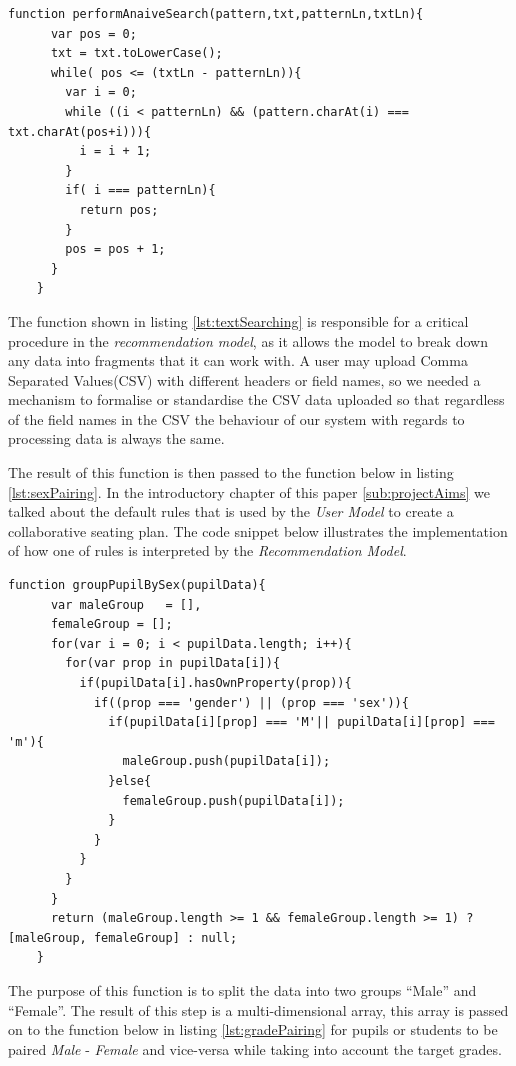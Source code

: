 \begin{lstlisting}[caption={Text Searching using Naive Search Technique}, label={lst:textSearching}]
    function performAnaiveSearch(pattern,txt,patternLn,txtLn){
      var pos = 0;
      txt = txt.toLowerCase();
      while( pos <= (txtLn - patternLn)){
        var i = 0;
        while ((i < patternLn) && (pattern.charAt(i) === txt.charAt(pos+i))){
          i = i + 1;
        }
        if( i === patternLn){
          return pos;
        }
        pos = pos + 1;
      }
    }
\end{lstlisting}
The function shown in listing \ref{lst:textSearching} is responsible for a critical procedure in the \emph{recommendation model}, as it allows the model to break down any data into fragments that it can work with. A user may upload Comma Separated Values(CSV) with different headers or field names, so we needed a mechanism to formalise or standardise the CSV data uploaded so that regardless of the field names in the CSV the behaviour of our system with regards to processing data is always the same.

The result of this function is then passed to the function below in listing \ref{lst:sexPairing}. In the introductory chapter of this paper  \ref{sub:projectAims} we talked about the default rules that is used by the \emph{User Model} to create a collaborative seating plan. The code snippet below illustrates the implementation of how one of rules is interpreted by the \emph{Recommendation Model}. 

\begin{lstlisting}[caption={group by sex}, label={lst:sexPairing}]
    function groupPupilBySex(pupilData){
      var maleGroup   = [],
      femaleGroup = [];
      for(var i = 0; i < pupilData.length; i++){
        for(var prop in pupilData[i]){
          if(pupilData[i].hasOwnProperty(prop)){
            if((prop === 'gender') || (prop === 'sex')){
              if(pupilData[i][prop] === 'M'|| pupilData[i][prop] === 'm'){
                maleGroup.push(pupilData[i]);
              }else{
                femaleGroup.push(pupilData[i]);
              }
            }
          }
        }
      }
      return (maleGroup.length >= 1 && femaleGroup.length >= 1) ? [maleGroup, femaleGroup] : null;
    }
\end{lstlisting}
The purpose of this function is to split the data into two groups ``Male'' and ``Female''. The result of this step is a multi-dimensional array, this array is passed on to the function below in listing \ref{lst:gradePairing} for pupils or students to be paired \emph{Male} - \emph{Female} and vice-versa while taking into account the target grades. 

